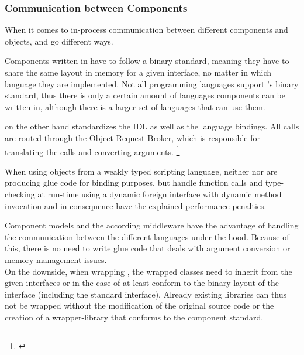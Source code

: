 \subsubsection{Communication between Components}

When it comes to in-process communication between different components and objects,  and  go different ways. 

Components written in  have to follow a binary standard, meaning they have to share the same layout in memory for a given interface, no matter in which language they are implemented. Not all programming languages support 's binary standard, thus there is only a certain amount of languages  components can be written in, although there is a larger set of languages that can use them.

 on the other hand standardizes the IDL as well as the language bindings. All calls are routed through the Object Request Broker, which is responsible for translating the calls and converting arguments. \footnote{\citep[83]{ComponentTechnology}}

When using objects from a weakly typed scripting language, neither  nor  are producing glue code for binding purposes, but handle function calls and type-checking at run-time using a dynamic foreign interface with dynamic method invocation and in consequence have the explained performance penalties.

Component models and the according middleware have the advantage of handling the communication between the different languages under the hood. Because of this, there is no need to write glue code that deals with argument conversion or memory management issues.\\
On the downside, when wrapping , the wrapped classes need to inherit from the given interfaces or in the case of  at least conform to the binary layout of the interface (including the standard  interface). Already existing libraries can thus not be wrapped without the modification of the original source code or the creation of a wrapper-library that conforms to the component standard.

